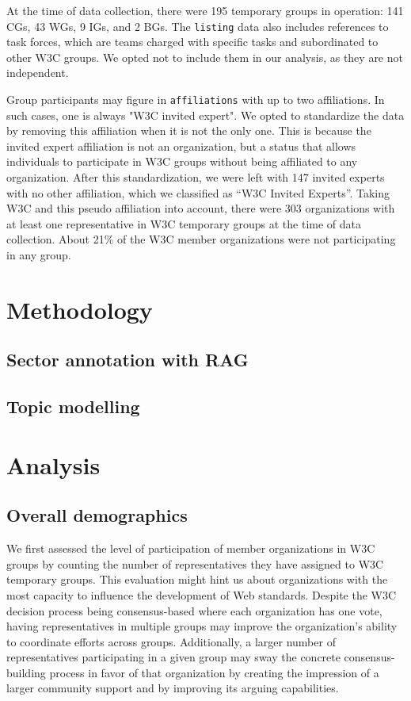 \documentclass[sigconf, nonacm]{acmart}              %
\begin{document}
At the time of data collection, there were 195 temporary groups in operation: 141 CGs, 43 WGs, 9 IGs, and 2 BGs. The \texttt{listing} data also includes references to task forces, which are teams charged with specific tasks and subordinated to other W3C groups. We opted not to include them in our analysis, as they are not independent. 

Group participants may figure in \texttt{affiliations} with up to two affiliations. In such cases, one is always "W3C invited expert". We opted to standardize the data by removing this affiliation when it is not the only one. This is because the invited expert affiliation is not an organization, but a status that allows individuals to participate in W3C groups without being affiliated to any organization. After this standardization, we were left with 147 invited experts with no other affiliation, which we classified as ``W3C Invited Experts''. Taking W3C and this pseudo affiliation into account, there were 303 organizations with at least one representative in W3C temporary groups at the time of data collection. About 21\% of the W3C member organizations were not participating in any group.

\section{Methodology}
\label{sec:methodology}

\subsection{Sector annotation with RAG}
\label{sec:lab}



\subsection{Topic modelling}


\section{Analysis}
\label{sec:analysis}

\subsection{Overall demographics}
\label{sec:demographics}

We first assessed the level of participation of member organizations in W3C groups by counting the number of representatives they have assigned to W3C temporary groups. This evaluation might hint us about organizations with the most capacity to influence the development of Web standards. Despite the W3C decision process being consensus-based where each organization has one vote, having representatives in multiple groups may improve the organization's ability to coordinate efforts across groups. Additionally, a larger number of representatives participating in a given group may sway the concrete consensus-building process in favor of that organization by creating the impression of a larger community support and by improving its arguing capabilities.
\end{document}
